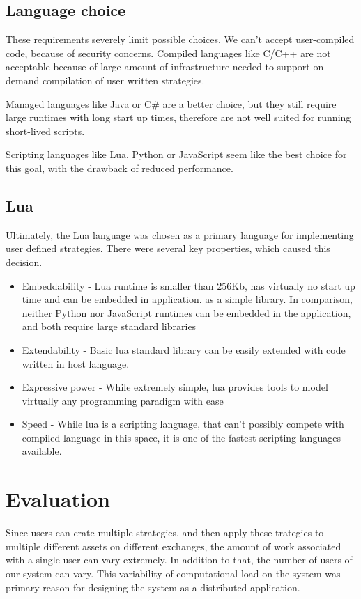 \subsection{Language choice}
These requirements severely limit possible choices. We can't accept user-compiled code, because of security concerns.
Compiled languages like C/C++ are not acceptable because of large amount of infrastructure needed to support
on-demand compilation of user written strategies.

Managed languages like Java or C\# are a better choice, but they still require large runtimes with long start up times, therefore
are not well suited for running short-lived scripts.

Scripting languages like Lua, Python or JavaScript seem like the best choice for this goal, with the drawback of
reduced performance.

\subsection{Lua}
Ultimately, the Lua language was chosen as a primary language for implementing user defined strategies. There were several
key properties, which caused this decision.

\begin{itemize}
    \item Embeddability - Lua runtime is smaller than 256Kb, has virtually no start up time and can be embedded in application.
    as a simple library. In comparison, neither Python nor JavaScript runtimes can be embedded in the application, and both
    require large standard libraries
    \item Extendability - Basic lua standard library can be easily extended with code written in host language.
    \item Expressive power - While extremely simple, lua provides tools to model virtually any programming paradigm with ease
    \item Speed - While lua is a scripting language, that can't possibly compete with compiled language in this space,
    it is one of the fastest scripting languages available.
\end{itemize}

\section{Evaluation}
Since users can crate multiple strategies, and then apply these trategies to multiple different assets on different exchanges,
the amount of work associated with a single user can vary extremely. In addition to that, the number of users of our system can vary.
This variability of computational load on the system was primary reason for designing the system as a distributed application.


